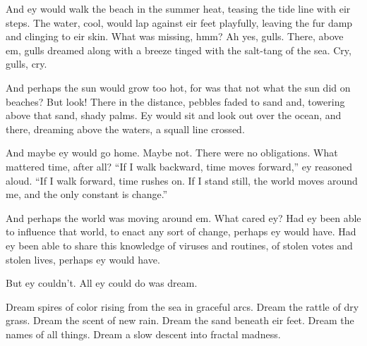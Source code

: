 And ey would walk the beach in the summer heat, teasing the tide line with eir steps. The water, cool, would lap against eir feet playfully, leaving the fur damp and clinging to eir skin. What was missing, hmm? Ah yes, gulls. There, above em, gulls dreamed along with a breeze tinged with the salt-tang of the sea. Cry, gulls, cry.

And perhaps the sun would grow too hot, for was that not what the sun did on beaches? But look! There in the distance, pebbles faded to sand and, towering above that sand, shady palms. Ey would sit and look out over the ocean, and there, dreaming above the waters, a squall line crossed.

And maybe ey would go home. Maybe not. There were no obligations. What mattered time, after all? ``If I walk backward, time moves forward,'' ey reasoned aloud. ``If I walk forward, time rushes on. If I stand still, the world moves around me, and the only constant is change.''

And perhaps the world was moving around em. What cared ey? Had ey been able to influence that world, to enact any sort of change, perhaps ey would have. Had ey been able to share this knowledge of viruses and routines, of stolen votes and stolen lives, perhaps ey would have.

But ey couldn't. All ey could do was dream.

Dream spires of color rising from the sea in graceful arcs. Dream the rattle of dry grass. Dream the scent of new rain. Dream the sand beneath eir feet. Dream the names of all things. Dream a slow descent into fractal madness.
